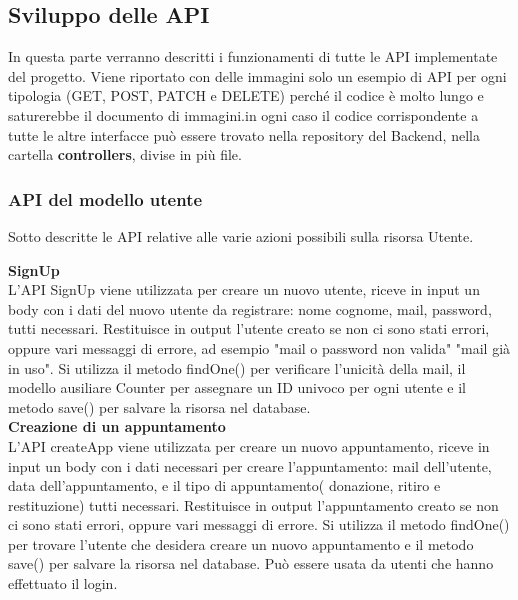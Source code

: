 \documentclass{article}
\begin{document}
\subsection{Sviluppo delle API}
In questa parte verranno descritti i funzionamenti di tutte le API implementate del progetto. 
Viene riportato con delle immagini solo un esempio di API per ogni tipologia (GET, POST, PATCH e DELETE) perché il codice è molto lungo e saturerebbe il documento di immagini.in ogni caso il codice corrispondente a tutte le altre interfacce può essere trovato nella repository del Backend, nella cartella \textbf{controllers}, divise in più file.

\subsubsection{API del modello utente}
Sotto descritte le API relative alle varie azioni possibili sulla risorsa Utente.

\vspace{0.5cm}

\noindent \textbf{SignUp}\\
L'API SignUp viene utilizzata per creare un nuovo utente, riceve in input un body con i dati del nuovo utente da registrare: nome cognome, mail, password, tutti necessari.
Restituisce in output l'utente creato se non ci sono stati errori, oppure vari messaggi di errore, ad esempio "mail o password non valida" "mail già in uso".
Si utilizza il metodo findOne() per verificare l'unicità della mail, il modello ausiliare Counter per assegnare un ID univoco per ogni utente e il metodo save() per salvare la risorsa nel database.\\

\noindent \textbf{Creazione di un appuntamento}\\
L'API createApp viene utilizzata per creare un nuovo appuntamento, riceve in input un body con i dati necessari per creare l'appuntamento: mail dell'utente, data dell'appuntamento, e il tipo di appuntamento( donazione, ritiro e restituzione) tutti necessari.
Restituisce in output l'appuntamento creato se non ci sono stati errori, oppure vari messaggi di errore.
Si utilizza il metodo findOne() per trovare l'utente che desidera creare un nuovo appuntamento e il metodo save() per salvare la risorsa nel database. Può essere usata da utenti che hanno effettuato il login.\\
\end{document}
